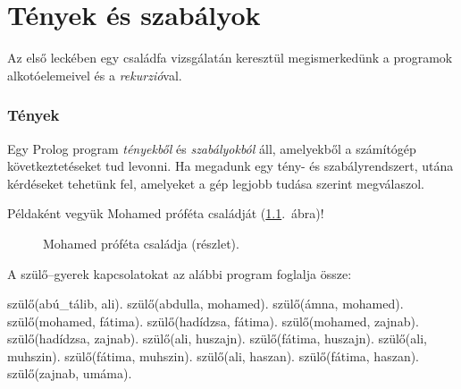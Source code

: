 
\chapter{Tények és szabályok}
Az első leckében egy családfa vizsgálatán keresztül
megismerkedünk a programok alkotóelemeivel és a
\emph{rekurzió}\/val.

\subsection*{Tények}
Egy Prolog program \emph{tényekből} és
\emph{szabályokból} áll, amelyekből a számítógép
következtetéseket tud levonni. Ha megadunk egy tény-
és szabályrendszert, utána kérdéseket tehetünk fel,
amelyeket a gép legjobb tudása szerint megválaszol.

Példaként vegyük Mohamed próféta családját
(\ref{fig:csaladfa}.~ábra)!
%
\begin{figure}
  \centering
  \caption{Mohamed próféta családja (részlet).}
  \label{fig:csaladfa}
\end{figure}
%
A szülő--gyerek kapcsolatokat az alábbi program
foglalja össze:

\begin{program}
szülő(abú_tálib, ali).
szülő(abdulla, mohamed).
szülő(ámna, mohamed).
szülő(mohamed, fátima).
szülő(hadídzsa, fátima).
szülő(mohamed, zajnab).
szülő(hadídzsa, zajnab).
szülő(ali, huszajn).
szülő(fátima, huszajn).
szülő(ali, muhszin).
szülő(fátima, muhszin).
szülő(ali, haszan).
szülő(fátima, haszan).
szülő(zajnab, umáma).
\end{program}

